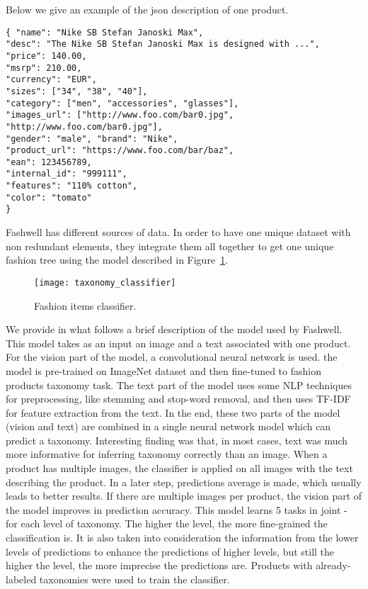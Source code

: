 Below we give an example of the json description of one product.

\begin{verbatim}
{ "name": "Nike SB Stefan Janoski Max",
"desc": "The Nike SB Stefan Janoski Max is designed with ...", 
"price": 140.00,			
"msrp": 210.00,
"currency": "EUR",
"sizes": ["34", "38", "40"],
"category": ["men", "accessories", "glasses"],
"images_url": ["http://www.foo.com/bar0.jpg", "http://www.foo.com/bar0.jpg"], 
"gender": "male", "brand": "Nike",
"product_url": "https://www.foo.com/bar/baz",
"ean": 123456789,
"internal_id": "999111",
"features": "110% cotton",
"color": "tomato"
}
\end{verbatim}


Fashwell has different sources of data. In order to have one unique dataset with non redundant elements, they integrate them all together to get one unique fashion tree using the model described in Figure~\ref{fig:classifier}.


\begin{figure}[htb] \centering 
  \texttt{[image: taxonomy\_classifier]}
  \caption{Fashion items classifier.}
  \label{fig:classifier}
\end{figure}


We provide in what follows a brief description of the model used by Fashwell. This model takes as an input an image and a text associated with one product. For the vision part of the model, a convolutional neural network is used. the model is pre-trained on ImageNet dataset and then fine-tuned to fashion products taxonomy task. The text part of the model uses some NLP techniques for preprocessing, like stemming and stop-word removal, and then uses TF-IDF for feature extraction from the text. In the end, these two parts of the model (vision and text) are combined in a single neural network model which can predict a taxonomy. Interesting finding was that, in most cases, text was much more informative for inferring taxonomy correctly than an image. When a product has multiple images, the classifier is applied on all images with the text describing the product. In a later step, predictions average is made, which usually leads to better results. If there are multiple images per product, the vision part of the model improves in prediction accuracy. This model learns 5 tasks in joint - for each level of taxonomy. The higher the level, the more fine-grained the classification is. It is also taken into consideration the information from the lower levels of predictions to enhance the predictions of higher levels, but still the higher the level, the more imprecise the predictions are. Products with already-labeled taxonomies were used to train the classifier. 


